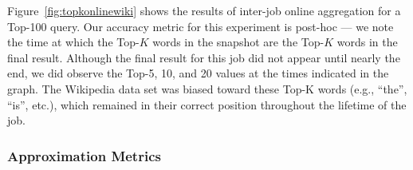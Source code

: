 

Figure~\ref{fig:topkonlinewiki} shows the results of inter-job online
aggregation for a Top-100 query. Our accuracy metric for this experiment is
post-hoc --- we note the time at which the Top-$K$ words in the snapshot are the
Top-$K$ words in the final result. Although the final result for this job did
not appear until nearly the end, we did observe the Top-5, 10, and 20 values at
the times indicated in the graph. The Wikipedia data set was biased toward these
Top-K words (e.g., ``the'', ``is'', etc.), which remained in their correct
position throughout the lifetime of the job.

\subsubsection{Approximation Metrics}

